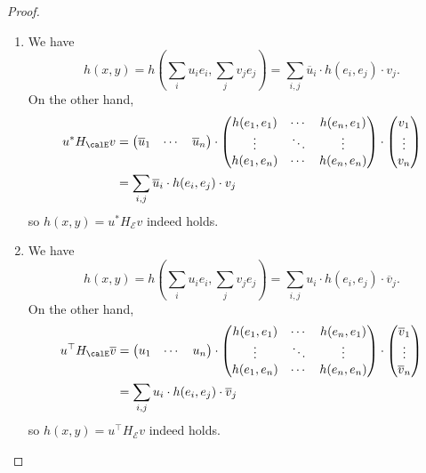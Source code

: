 \begin{proof}
    \begin{enumerate}
        \item We have 
        $$h(x,y) = h\left(\sum_i u_i e_i, \sum_j v_j e_j \right) = \sum_{i,j} \overline{u}_i \cdot h(e_i,e_j) \cdot v_j.$$
        On the other hand,
        \begin{align*}
        u^{*} H_\calE v &= \begin{pmatrix} \overline{u}_1 & \cdots & \overline{u}_n \end{pmatrix} \cdot \begin{pmatrix} h(e_1,e_1) & \cdots & h(e_n,e_1) \\ \vdots & \ddots & \vdots \\ h(e_1, e_n) & \cdots & h(e_n,e_n) \end{pmatrix} \cdot \begin{pmatrix} v_1 \\ \vdots \\ v_n \end{pmatrix} \\
        &= \sum_{i,j} \overline{u}_i \cdot h(e_i,e_j) \cdot v_j
        \end{align*}
        so $h(x,y) = u^* H_{\mathcal{E}} v$ indeed holds.

        \item We have 
        $$h(x,y) = h\left(\sum_i u_i e_i, \sum_j v_j e_j \right) = \sum_{i,j} u_i \cdot h(e_i,e_j) \cdot \overline{v}_j.$$
        On the other hand,
        \begin{align*}
        u^{\top} H_\calE \overline{v} &= \begin{pmatrix} u_1 & \cdots & u_n \end{pmatrix} \cdot \begin{pmatrix} h(e_1,e_1) & \cdots & h(e_n,e_1) \\ \vdots & \ddots & \vdots \\ h(e_1, e_n) & \cdots & h(e_n,e_n) \end{pmatrix} \cdot \begin{pmatrix} \overline{v}_1 \\ \vdots \\ \overline{v}_n \end{pmatrix} \\
        &= \sum_{i,j} u_i \cdot h(e_i,e_j) \cdot \overline{v}_j
        \end{align*}
        so $h(x,y) = u^\top H_{\mathcal{E}} v$ indeed holds.
    \end{enumerate}

\end{proof}